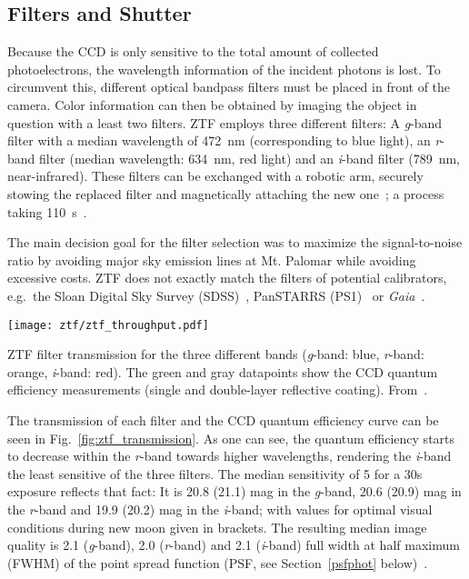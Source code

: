 \subsection{Filters and Shutter}\label{ztf_filters}
Because the CCD is only sensitive to the total amount of collected photoelectrons, the wavelength information of the incident photons is lost. To circumvent this, different optical bandpass filters must be placed in front of the camera. Color information can then be obtained by imaging the object in question with a least two filters. ZTF employs three different filters: A \textit{g}-band filter with a median wavelength of \SI{472}{\nano\meter} (corresponding to blue light), an \textit{r}-band filter (median wavelength: \SI{634}{\nano\meter}, red light) and an \textit{i}-band filter (\SI{789}{\nano\meter}, near-infrared). These filters can be exchanged with a robotic arm, securely stowing the replaced filter and magnetically attaching the new one~\cite{Dekany2020}; a process taking \SI{110}{\second}~\cite{Bellm2019}.

The main decision goal for the filter selection was to maximize the signal-to-noise ratio by avoiding major sky emission lines at Mt. Palomar while avoiding excessive costs. ZTF does not exactly match the filters of potential calibrators, e.g.\ the Sloan Digital Sky Survey (SDSS)~, PanSTARRS (PS1)~ or \textit{Gaia}~.

\begin{marginfigure}
    \texttt{[image: ztf/ztf\_throughput.pdf]}
    \caption[ZTF filter transmission]{ZTF filter transmission for the three different bands (\textit{g}-band: blue, \textit{r}-band: orange, \textit{i}-band: red). The green and gray datapoints show the CCD quantum efficiency measurements (single and double-layer reflective coating). From~\cite{Bellm2019}.}
\end{marginfigure}

The transmission of each filter and the CCD quantum efficiency curve can be seen in Fig.~\ref{fig:ztf_transmission}. As one can see, the quantum efficiency starts to decrease within the \textit{r}-band towards higher wavelengths, rendering the \textit{i}-band the least sensitive of the three filters. The median sensitivity of \SI{5}{\sigma} for a 30s exposure reflects that fact: It is 20.8 (21.1) mag in the \textit{g}-band, 20.6 (20.9) mag in the \textit{r}-band and 19.9 (20.2) mag in the \textit{i}-band; with values for optimal visual conditions during new moon given in brackets. The resulting median image quality is \SI{2.1}{\arcsec} (\textit{g}-band), \SI{2.0}{\arcsec} (\textit{r}-band) and \SI{2.1}{\arcsec} (\textit{i}-band) full width at half maximum (FWHM) of the point spread function (PSF, see Section~\ref{psfphot} below)~\cite{Bellm2019}.

